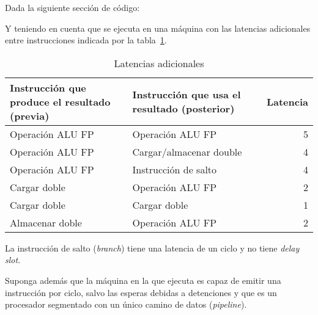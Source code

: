 \begin{acexercise}
\end{acexercise}

Dada la siguiente sección de código:



Y teniendo en cuenta que se ejecuta en una máquina con las latencias
adicionales entre instrucciones indicada por la
tabla~\ref{tab:ex-may-2012:lat}.

\begin{table}[htbp]
\caption{Latencias adicionales}
\label{tab:ex-may-2012:lat}

\begin{tabular}{|p{}|p{}|p{}|}

\hline
Instrucción que produce el resultado (previa) &
Instrucción que usa el resultado (posterior) &
Latencia
\\
\hline
\hline

Operación ALU FP & 
Operación ALU FP &
\multicolumn{1}{r|}{5}
\\
\hline

Operación ALU FP &
Cargar/almacenar double &
\multicolumn{1}{r|}{4}
\\
\hline

Operación ALU FP &
Instrucción de salto &
\multicolumn{1}{r|}{4}
\\
\hline

Cargar doble &
Operación ALU FP &
\multicolumn{1}{r|}{2}
\\
\hline

Cargar doble &
Cargar doble &
\multicolumn{1}{r|}{1}
\\
\hline

Almacenar doble	&
Operación ALU FP &
\multicolumn{1}{r|}{2}
\\
\hline

\end{tabular}

\end{table}

La instrucción de salto (\emph{branch}) tiene una latencia de un ciclo y no
tiene \emph{delay slot}. 

Suponga además que la máquina en la que ejecuta es capaz de emitir una
instrucción por ciclo, salvo las esperas debidas a detenciones y que es un
procesador segmentado con un único camino de datos (\emph{pipeline}). 

